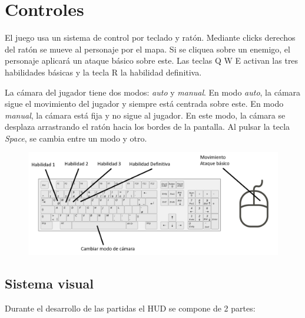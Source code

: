 \vspace{\baselineskip}
\vspace{\baselineskip}

\section{Controles}
El juego usa un sistema de control por teclado y ratón. Mediante clicks derechos del ratón se mueve al personaje por el mapa. Si se cliquea sobre un enemigo, el personaje aplicará un ataque básico sobre este.
Las teclas Q W E activan las tres habilidades básicas y la tecla R la habilidad definitiva.

\vspace{\baselineskip}

La cámara del jugador tiene dos modos: \emph{auto} y \emph{manual}. En modo \emph{auto}, la cámara sigue el movimiento del jugador y siempre está centrada sobre este. En modo \emph{manual}, la cámara está fija y no sigue al jugador. En este modo, la cámara se desplaza arrastrando el ratón hacia los bordes de la pantalla. Al pulsar la tecla \emph{Space}, se cambia entre un modo y otro.

\vspace{\baselineskip}

\begin{figure}[h]
	\centering
	\includegraphics[width=0.8\linewidth]{figures/controles.png}
\end{figure}


\newpage

\subsection{Sistema visual}

Durante el desarrollo de las partidas el HUD se compone de 2 partes:

\vspace{\baselineskip}

